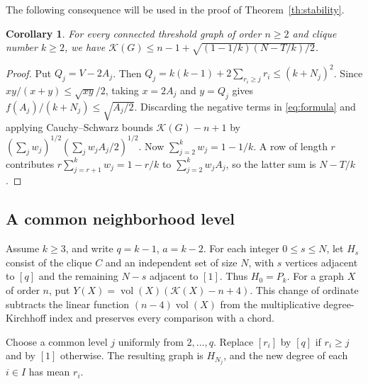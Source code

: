 \documentclass[11pt]{amsart}
\newtheorem{corollary}[theorem]{Corollary}
\numberwithin{equation}{section}
\newcommand{\K}{\mathcal K}
\DeclareMathOperator{\vol}{vol}
\begin{document}
The following consequence will be used in the proof of
Theorem~\ref{th:stability}.

\begin{corollary}\label{cor:uniform}
For every connected threshold graph of order $n\ge2$ and clique number
$k\ge2$, we have $\K(G)\le n-1+\sqrt{(1-1/k)(N-T/k)/2}$.
\end{corollary}
\begin{proof}
Put $Q_j=V-2A_j$. Then
$Q_j=k(k-1)+2\sum_{r_i\ge j}r_i\le(k+N_j)^2$. Since
$xy/(x+y)\le\sqrt{xy}/2$, taking $x=2A_j$ and $y=Q_j$ gives
$f(A_j)/(k+N_j)\le\sqrt{A_j/2}$. Discarding the negative terms
in \eqref{eq:formula} and applying Cauchy--Schwarz bounds
$\K(G)-n+1$ by $(\sum_j w_j)^{1/2}(\sum_j w_jA_j/2)^{1/2}$.
Now $\sum_{j=2}^k w_j=1-1/k$. A row of length $r$ contributes
$r\sum_{j=r+1}^k w_j=1-r/k$ to $\sum_{j=2}^k w_jA_j$, so the
latter sum is $N-T/k$.
\end{proof}

\subsection{A common neighborhood level}
Assume $k\ge3$, and write $q=k-1$, $a=k-2$. For each integer $0\le s\le N$, let $H_s$ consist of the clique $C$ and an independent set
of size $N$, with $s$ vertices adjacent to $[q]$ and the remaining
$N-s$ adjacent to $[1]$. Thus $H_0=P_k$. For
a graph $X$ of order $n$, put $Y(X)=\vol(X)(\K(X)-n+4)$.
This change of ordinate subtracts the linear function $(n-4)\vol(X)$
from the multiplicative degree-Kirchhoff index and preserves every
comparison with a chord.

Choose a common level $j$ uniformly from $2,\ldots,q$. Replace
$[r_i]$ by $[q]$ if $r_i\ge j$ and by $[1]$ otherwise. The resulting
graph is $H_{N_j}$, and the new degree of each $i\in I$ has mean $r_i$.
\end{document}
